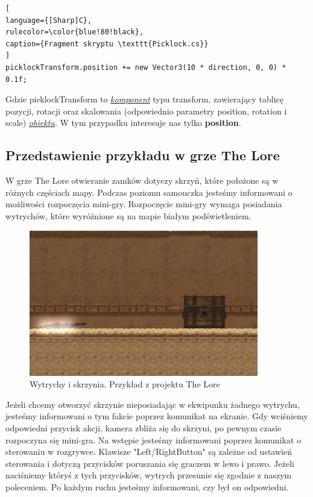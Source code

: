 \documentclass[oneside,polski,logo]{amuthesis}
\begin{document}
\begin{lstlisting}[
language={[Sharp]C},
rulecolor=\color{blue!80!black},
caption={Fragment skryptu \texttt{Picklock.cs}}
]
picklockTransform.position += new Vector3(10 * direction, 0, 0) * 0.1f;
\end{lstlisting}

Gdzie picklockTransform to \hyperref[sec:komponent]{\emph{komponent}} typu transform, zawierający tablicę pozycji, rotacji oraz skalowania (odpowiednio parametry position, rotation i scale) \hyperref[sec:gameobject]{\emph{obiektu}}. W tym przypadku interesuje nas tylko \textbf{position}. 
\subsection{Przedstawienie przykładu w grze The Lore}
W grze The Lore otwieranie zamków dotyczy skrzyń, które położone są w różnych częściach mapy. Podczas poziomu samouczka jesteśmy informowani o możliwości rozpoczęcia mini-gry. Rozpoczęcie mini-gry wymaga posiadania wytrychów, które wyróżnione są na mapie białym podświetleniem.

\begin{figure}[h]
	\centering
	\includegraphics[width=10cm]{images/tyrek/skrzynia.png}
	\caption{Wytrychy i skrzynia. Przykład z projektu The Lore}
\end{figure}

Jeżeli chcemy otworzyć skrzynie nieposiadając w ekwipunku żadnego wytrychu, jesteśmy informowani o tym fakcie poprzez komunikat na ekranie. Gdy wciśniemy odpowiedni przycisk akcji, kamera zbliża się do skrzyni, po pewnym czasie rozpoczyna się mini-gra.
Na wstępie jesteśmy informowani poprzez komunikat o sterowaniu w rozgrywce. Klawisze "Left/RightButton" są zależne od ustawień sterowania i dotyczą przycisków poruszania się graczem w lewo i prawo. Jeżeli naciśniemy któryś z tych przycisków, wytrych przesunie się zgodnie z naszym poleceniem. Po każdym ruchu jesteśmy informowani, czy był on odpowiedni.
\end{document}
